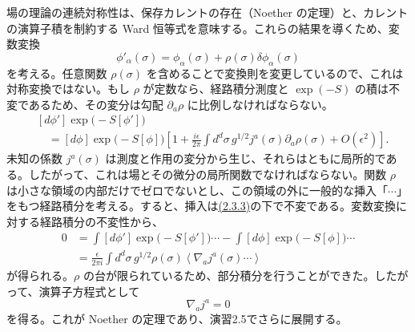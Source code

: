 場の理論の連続対称性は、保存カレントの存在（Noether の定理）と、カレントの演算子積を制約する Ward 恒等式を意味する。これらの結果を導くため、変数変換
\begin{equation}
\phi'_\alpha(\sigma)=\phi_\alpha(\sigma)
+\rho(\sigma)\delta\phi_\alpha(\sigma)
\tag{2.3.3}\label{eq:2.3.3}
\end{equation}
を考える。任意関数 $\rho(\sigma)$ を含めることで変換則を変更しているので、これは対称変換ではない。もし $\rho$ が定数なら、経路積分測度と $\exp(-S)$ の積は不変であるため、その変分は勾配 $\partial_a\rho$ に比例しなければならない。
\begin{equation}
\begin{aligned}
&[d\phi']\exp\bigl(-S[\phi']\bigr)\\
&\quad=[d\phi]\exp\bigl(-S[\phi]\bigr)
\left[1+\frac{i\epsilon}{2\pi}\int d^d\sigma\,g^{1/2}
j^a(\sigma)\partial_a\rho(\sigma)+O(\epsilon^2)\right].
\end{aligned}
\tag{2.3.4}\label{eq:2.3.4}
\end{equation}
未知の係数 $j^a(\sigma)$ は測度と作用の変分から生じ、それらはともに局所的である。したがって、これは場とその微分の局所関数でなければならない。関数 $\rho$ は小さな領域の内部だけでゼロでないとし、この領域の外に一般的な挿入「$\cdots$」をもつ経路積分を考える。すると、挿入は\hyperref[eq:2.3.3]{(2.3.3)}の下で不変である。変数変換に対する経路積分の不変性から、
\begin{equation}
\begin{aligned}
0&=\int[d\phi']\exp\bigl(-S[\phi']\bigr)\cdots
-\int[d\phi]\exp\bigl(-S[\phi]\bigr)\cdots\\
&=\frac{\epsilon}{2\pi i}\int d^d\sigma\,g^{1/2}\rho(\sigma)
\left\langle\nabla_aj^a(\sigma)\cdots\right\rangle
\end{aligned}
\tag{2.3.5}\label{eq:2.3.5}
\end{equation}
が得られる。$\rho$ の台が限られているため、部分積分を行うことができた。したがって、演算子方程式として
\begin{equation}
\nabla_aj^a=0
\tag{2.3.6}\label{eq:2.3.6}
\end{equation}
を得る。これが Noether の定理であり、演習2.5でさらに展開する。

